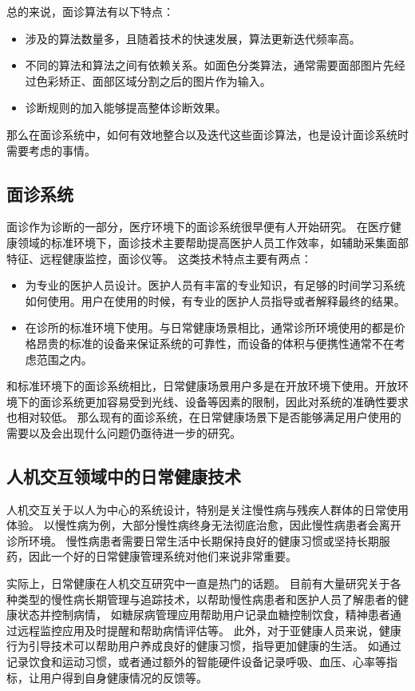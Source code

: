 总的来说，面诊算法有以下特点：

\begin{itemize}
    \item 涉及的算法数量多，且随着技术的快速发展，算法更新迭代频率高。
    \item 不同的算法和算法之间有依赖关系。如面色分类算法，通常需要面部图片先经过色彩矫正、面部区域分割之后的图片作为输入。
    \item 诊断规则的加入能够提高整体诊断效果。
\end{itemize}

那么在面诊系统中，如何有效地整合以及迭代这些面诊算法，也是设计面诊系统时需要考虑的事情。

\subsection{面诊系统}

面诊作为诊断的一部分，医疗环境下的面诊系统很早便有人开始研究。
在医疗健康领域的标准环境下，面诊技术主要帮助提高医护人员工作效率，如辅助采集面部特征\cite{张红凯2015中医面诊信息采集与识别方法研究进展}、远程健康监控\cite{Hossain2015Cloud}，面诊仪\cite{邸丹2016手持式舌象仪的研制}等。
这类技术特点主要有两点：
\begin{itemize}
    \item 为专业的医护人员设计。医护人员有丰富的专业知识，有足够的时间学习系统如何使用。用户在使用的时候，有专业的医护人员指导或者解释最终的结果。
    \item 在诊所的标准环境下使用。与日常健康场景相比，通常诊所环境使用的都是价格昂贵的标准的设备来保证系统的可靠性，而设备的体积与便携性通常不在考虑范围之内。
\end{itemize}

和标准环境下的面诊系统相比，日常健康场景用户多是在开放环境下使用。开放环境下的面诊系统更加容易受到光线、设备等因素的限制，因此对系统的准确性要求也相对较低。
那么现有的面诊系统，在日常健康场景下是否能够满足用户使用的需要以及会出现什么问题仍亟待进一步的研究。

\subsection{人机交互领域中的日常健康技术}
人机交互关于以人为中心的系统设计，特别是关注慢性病与残疾人群体的日常使用体验。
以慢性病为例，大部分慢性病终身无法彻底治愈，因此慢性病患者会离开诊所环境。
慢性病患者需要日常生活中长期保持良好的健康习惯或坚持长期服药，因此一个好的日常健康管理系统对他们来说非常重要。

实际上，日常健康在人机交互研究中一直是热门的话题。
目前有大量研究关于各种类型的慢性病长期管理与追踪技术，以帮助慢性病患者和医护人员了解患者的健康状态并控制病情，
如糖尿病管理应用帮助用户记录血糖控制饮食\cite{burgermaster2019personal}，精神患者通过远程监控应用及时提醒和帮助病情评估\cite{lazar2016evaluation}等。
此外，对于亚健康人员来说，健康行为引导技术可以帮助用户养成良好的健康习惯，指导更加健康的生活。
如通过记录饮食和运动习惯，或者通过额外的智能硬件设备记录呼吸、血压、心率等指标\cite{kay2012lullaby,gronvall2013beyond}，让用户得到自身健康情况的反馈等。


